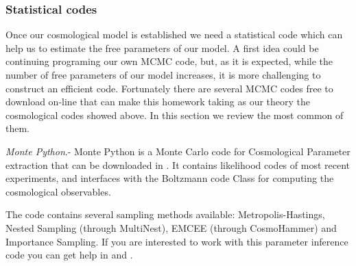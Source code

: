 \documentclass[onecolumn,           %
               showpacs,            %
               preprintnumbers,     %
               aps,                 %
               prl,          	    %
               letterpaper,             %
               superscriptaddress,      %
               nofootinbib,         %
               tightenlines,        %
               floats,floatfix      %
               ,usenatbib,
               ]{revtex4-1}
\begin{document}




\subsubsection{Statistical codes}

Once our cosmological model is established we need a statistical code which can help us to estimate the free parameters of our model. A first idea could be continuing programing our own MCMC code, but, as it is expected, while the number of free parameters of our model increases, it is more challenging to construct an efficient code. Fortunately there are several MCMC codes free to download on-line that can make this homework taking as our theory the cosmological codes showed above. In this section we review the most common of them.

\textit{Monte Python}.-
Monte Python is a Monte Carlo code for Cosmological Parameter extraction  that can be downloaded in \cite{MP1}. It contains likelihood codes of most recent experiments, and interfaces with the Boltzmann code Class for computing the cosmological observables.

The code contains several sampling methods available: Metropolis-Hastings, Nested Sampling (through MultiNest), EMCEE (through CosmoHammer) and Importance Sampling. If you are interested to work with this parameter inference code you can get help in \cite{mont1} and \cite{MP2}.
\end{document}
